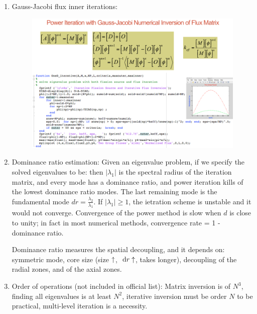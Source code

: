 \documentclass{school-22.211-notes}
\begin{document}
\begin{enumerate}
\item Gauss-Jacobi flux inner iterations: 
\begin{figure}[ht]
  \centering
  \includegraphics[width=5in]{images/dfs/power-iteration-Gauss-Jacobi.png}
\end{figure}

\item Dominance ratio estimation: 
Given an eigenvalue problem, if we specify the solved eigenvalues to be:
then $|\lambda_1|$ is the spectral radius of the iteration matrix, and every mode has a dominance ratio,
and power iteration kills of the lowest dominance ratio modes. The last remaining mode is the fundamental mode $dr = \frac{\lambda_2}{\lambda_1}$. If $|\lambda_1| \ge 1$, the ietration scheme is unstable and it would not converge. Convergence of the power method is slow when $d$ is close to unity; in fact in most numerical methods, convergence rate = 1 - dominance ratio.

Dominance ratio measures the spatial decoupling, and it depends on: symmetric mode, core size (size $\uparrow$, $\mbox{ }\mathrm{d} r \uparrow$, takes longer), decoupling of the radial zones, and of the axial zones. 

\item Order of operations (not included in official list): Matrix inversion is of $N^3$, finding all eigenvalues is at least $N^2$, iterative inversion must be order $N$ to be practical, multi-level iteration is a necessity. 
\end{enumerate}
\end{document}
